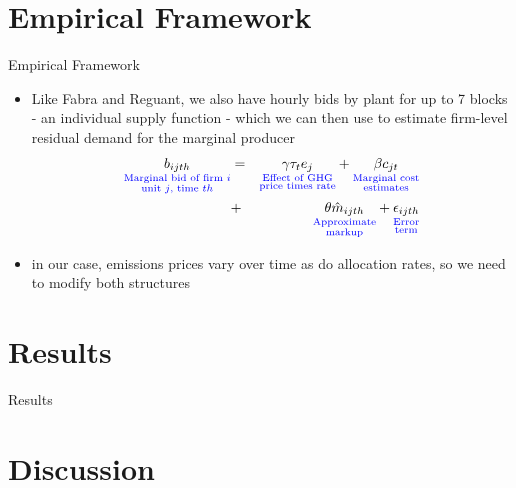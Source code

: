 \documentclass{beamer}
\begin{document}
\section{Empirical Framework}
\begin{frame}{Empirical Framework}
    \begin{block}{}
    \begin{itemize}
    \item Like Fabra and Reguant, we also have hourly bids by plant for up to 7 blocks - an individual supply function - which we can then use to estimate firm-level residual demand for the marginal producer
    \begin{eqnarray*}\label{eq:production}
    \underset{\color{blue}\substack{\text{Marginal bid of firm $i$}\\{\text{unit $j$, time $th$}}}} {b_{ijth}} &=&\underset{\color{blue}\substack{\text{Effect of GHG}\\{\text{price times rate}}}} {\gamma\tau_te_{j}}
    +\underset{\color{blue}\substack{\text{Marginal cost}\\{\text{estimates}}}} {\beta c_{jt}}\\&+&
    \underset{\color{blue}\substack{\text{Approximate}\\{\text{markup}}}}{\theta\hat{m}_{ijth}}
    + \underset{\color{blue}\substack{\text{Error}\\{\text{term}}}}{\epsilon_{ijth}}
    \end{eqnarray*}
\item in our case, emissions prices vary over time as do allocation rates, so we need to modify both structures
    \end{itemize}
  \end{block}
   \vfill
\end{frame}



\section{Results}

\begin{frame}{Results}
   \vfill
\end{frame}


\section{Discussion}
\end{document}
